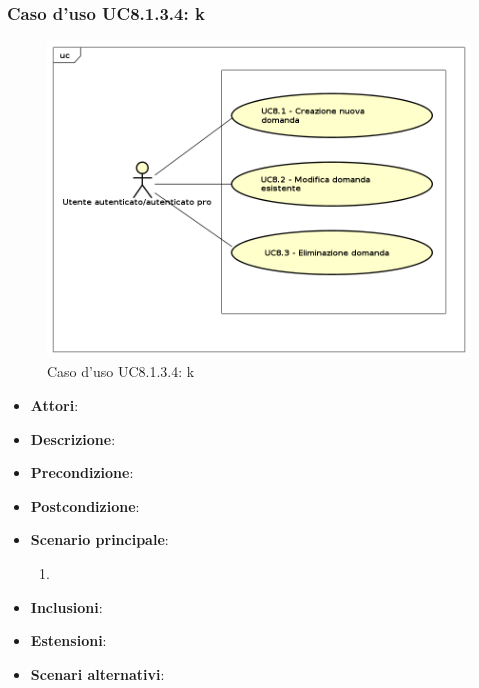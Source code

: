 \subsubsection{Caso d'uso UC8.1.3.4: k}
\label{UC8.1.3.4.}
\begin{figure}[h]
	\centering
	\includegraphics[scale=0.5,keepaspectratio]{UML/UC8.png}
	\caption{Caso d'uso UC8.1.3.4: k}
\end{figure}
\FloatBarrier
\begin{itemize}
	\item \textbf{Attori}: 
	\item \textbf{Descrizione}:
	\item \textbf{Precondizione}: 
	\item \textbf{Postcondizione}: 
	\item \textbf{Scenario principale}: 
	\begin{enumerate}
		\item
	\end{enumerate}
	\item \textbf{Inclusioni}: 
	\item \textbf{Estensioni}: 
	\item \textbf{Scenari alternativi}: 
\end{itemize}